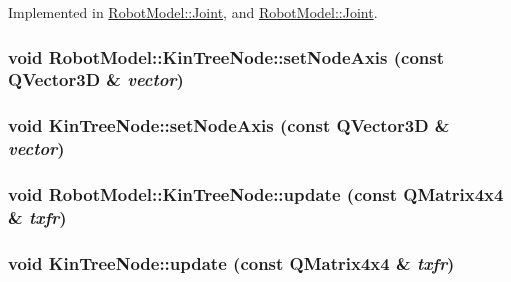 Implemented in \hyperlink{class_robot_model_1_1_joint_a485f5fc46f5156a7383bee7edbfc6643}{RobotModel::Joint}, and \hyperlink{class_robot_model_1_1_joint_a485f5fc46f5156a7383bee7edbfc6643}{RobotModel::Joint}.\hypertarget{class_robot_model_1_1_kin_tree_node_a5621900c9c0d0fba3ce350dd446403e8}{
\subsubsection[{setNodeAxis}]{\setlength{\rightskip}{0pt plus 5cm}void RobotModel::KinTreeNode::setNodeAxis (const QVector3D \& {\em vector})}}
\label{class_robot_model_1_1_kin_tree_node_a5621900c9c0d0fba3ce350dd446403e8}
\hypertarget{class_robot_model_1_1_kin_tree_node_ae62ad98d6c2151232c20f1542c81a38b}{
\subsubsection[{setNodeAxis}]{\setlength{\rightskip}{0pt plus 5cm}void KinTreeNode::setNodeAxis (const QVector3D \& {\em vector})}}
\label{class_robot_model_1_1_kin_tree_node_ae62ad98d6c2151232c20f1542c81a38b}
\hypertarget{class_robot_model_1_1_kin_tree_node_a035b82b85c6a5f54e027bc05684f1032}{
\subsubsection[{update}]{\setlength{\rightskip}{0pt plus 5cm}void RobotModel::KinTreeNode::update (const QMatrix4x4 \& {\em txfr})}}
\label{class_robot_model_1_1_kin_tree_node_a035b82b85c6a5f54e027bc05684f1032}
\hypertarget{class_robot_model_1_1_kin_tree_node_a7edaa7f382637f6a15c3af68f4dfc7ab}{
\subsubsection[{update}]{\setlength{\rightskip}{0pt plus 5cm}void KinTreeNode::update (const QMatrix4x4 \& {\em txfr})}}
\label{class_robot_model_1_1_kin_tree_node_a7edaa7f382637f6a15c3af68f4dfc7ab}


